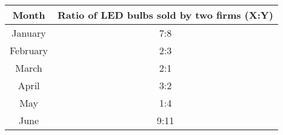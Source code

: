         \begin{tabular}{|c|c|}
            \hline
            Month & Ratio of LED bulbs sold by two firms (X:Y) \\
            \hline
            January &  7:8 \\
            February &  2:3 \\
            March & 2:1 \\
            April & 3:2 \\
            May & 1:4 \\
            June & 9:11 \\
            \hline
        \end{tabular}
